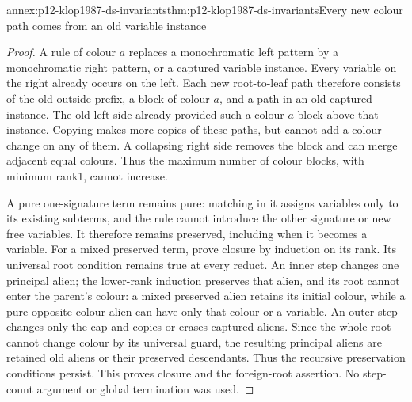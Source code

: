 \begin{annexitem}{annex:p12-klop1987-ds-invariants}{thm:p12-klop1987-ds-invariants}{Every new colour path comes from an old variable instance}
\begin{proof}
A rule of colour \(a\) replaces a monochromatic left pattern
by a monochromatic right pattern, or a captured variable instance.
Every variable on the right already occurs on the left. Each new
root-to-leaf path therefore consists of the old outside prefix,
a block of colour \(a\), and a path in an old captured instance.
The old left side already provided such a colour-\(a\) block
above that instance. Copying makes more copies of these paths,
but cannot add a colour change on any of them. A collapsing right
side removes the block and can merge adjacent equal colours.
Thus the maximum number of colour blocks, with minimum rank1,
cannot increase.

A pure one-signature term remains pure: matching in it assigns
variables only to its existing subterms, and the rule cannot
introduce the other signature or new free variables. It therefore
remains preserved, including when it becomes a variable.
For a mixed preserved term, prove closure by induction on its rank.
Its universal root condition remains true at every reduct.
An inner step changes one principal alien; the lower-rank induction
preserves that alien, and its root cannot enter the parent's colour:
a mixed preserved alien retains its initial colour, while a pure
opposite-colour alien can have only that colour or a variable.
An outer step changes only the cap and copies or erases captured
aliens. Since the whole root cannot change colour by its universal
guard, the resulting principal aliens are retained old aliens or
their preserved descendants. Thus the recursive preservation
conditions persist. This proves closure and the foreign-root
assertion. No step-count argument or global termination was used.
\end{proof}
\end{annexitem}

